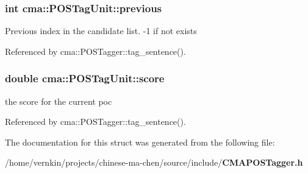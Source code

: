 \subsubsection[{previous}]{\setlength{\rightskip}{0pt plus 5cm}int {\bf cma::POSTagUnit::previous}}\label{structcma_1_1POSTagUnit_af11c0faeb5fb6c58348768403a9714a9}
Previous index in the candidate list. -\/1 if not exists 

Referenced by cma::POSTagger::tag\_\-sentence().
\subsubsection[{score}]{\setlength{\rightskip}{0pt plus 5cm}double {\bf cma::POSTagUnit::score}}\label{structcma_1_1POSTagUnit_a8256b2cd6fab35e40cc1bc2dd3b39ce2}
the score for the current poc 

Referenced by cma::POSTagger::tag\_\-sentence().

The documentation for this struct was generated from the following file:\begin{DoxyCompactItemize}
\item 
/home/vernkin/projects/chinese-\/ma-\/chen/source/include/{\bf CMAPOSTagger.h}\end{DoxyCompactItemize}
